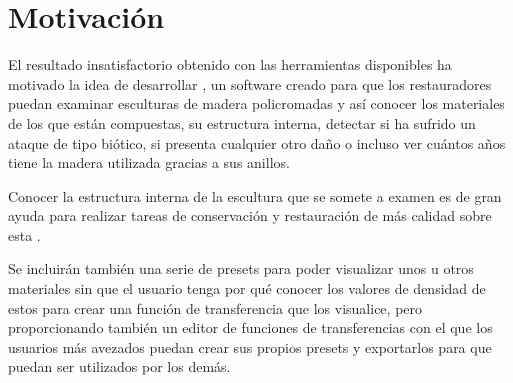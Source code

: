 \section{Motivación}

El resultado insatisfactorio obtenido con las herramientas disponibles ha motivado la idea de desarrollar \myTitle, un software creado para que los restauradores puedan examinar esculturas de madera policromadas y así conocer los materiales de los que están compuestas, su estructura interna, detectar si ha sufrido un ataque de tipo biótico, si presenta cualquier otro daño o incluso ver cuántos años tiene la madera utilizada gracias a sus anillos.

Conocer la estructura interna de la escultura que se somete a examen es de gran ayuda para realizar tareas de conservación y restauración de más calidad sobre esta \cite{tc_esculturas}.

Se incluirán también una serie de presets para poder visualizar unos u otros materiales sin que el usuario tenga por qué conocer los valores de densidad de estos para crear una función de transferencia que los visualice, pero proporcionando también un editor de funciones de transferencias con el que los usuarios más avezados puedan crear sus propios presets y exportarlos para que puedan ser utilizados por los demás.
